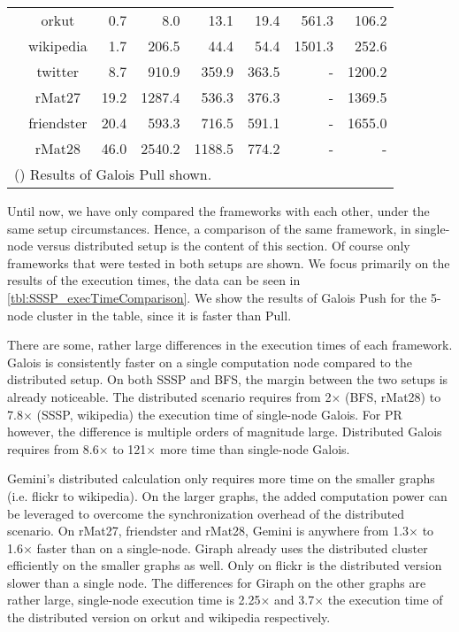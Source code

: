 \begin{table}
\begin{tabular}{ccr@{\tabskip 1 \tabcolsep}r
	r@{\tabskip 1 \tabcolsep}r
	r@{\tabskip 1 \tabcolsep}r}
		& orkut & 0.7\txtdagger & 8.0 & 13.1 & 19.4 & 561.3 & 106.2 \\
		& wikipedia & 1.7\txtdagger & 206.5 & 44.4 & 54.4 & 1501.3 & 252.6 \\
		& twitter & 8.7\txtdagger & 910.9 & 359.9 & 363.5 & - & 1200.2 \\
		& rMat27 & 19.2\txtdagger & 1287.4 & 536.3 & 376.3 & - & 1369.5 \\
		& friendster & 20.4\txtdagger & 593.3 & 716.5 & 591.1 & - & 1655.0 \\
		& rMat28 & 46.0\txtdagger & 2540.2 & 1188.5 & 774.2 & - & - \\
		\bottomrule
		\multicolumn{8}{l}{(\txtdagger) Results of Galois Pull shown.}
	\end{tabular}
\end{table}
Until now, we have only compared the frameworks with each other, under the same setup circumstances. Hence, a comparison of the same framework, in single-node versus distributed setup is the content of this section.
Of course only frameworks that were tested in both setups are shown.
We focus primarily on the results of the execution times, the data can be seen in \autoref{tbl:SSSP_execTimeComparison}. We show the results of Galois Push for the 5-node cluster in the table, since it is faster than Pull.

There are some, rather large differences in the execution times of each framework. Galois is consistently faster on a single computation node compared to the distributed setup. 
On both SSSP and BFS, the margin between the two setups is already noticeable. The distributed scenario requires from 2$\times$ (BFS, rMat28) to 7.8$\times$ (SSSP, wikipedia) the execution time of single-node Galois.
For PR however, the difference is multiple orders of magnitude large. Distributed Galois requires from 8.6$\times$ to 121$\times$ more time than single-node Galois. 




Gemini's distributed calculation only requires more time on the smaller graphs (i.e. flickr to wikipedia). On the larger graphs, the added computation power can be leveraged to overcome the synchronization overhead of the distributed scenario. On rMat27, friendster and rMat28, Gemini is anywhere from 1.3$\times$ to 1.6$\times$ faster than on a single-node.
Giraph already uses the distributed cluster efficiently on the smaller graphs as well. Only on flickr is the distributed version slower than a single node. The differences for Giraph on the other graphs are rather large, single-node execution time is 2.25$\times$ and 3.7$\times$ the execution time of the distributed version on orkut and wikipedia respectively.





